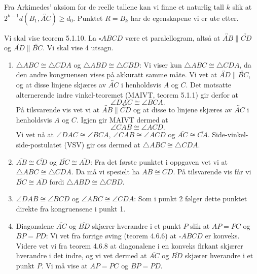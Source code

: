 \begin{oppgave}[4.8.10]
    Fra Arkimedes' aksiom for de reelle tallene kan vi finne et naturlig tall $k$ slik at $2^{k-1}d(B_1, \overleftrightarrow{AC})\geq d_0$. 
    Punktet $R=B_k$ har de egenskapene vi er ute etter. 
\end{oppgave}

\begin{oppgave}[5.1.2]
    Vi skal vise teorem 5.1.10. 
    La $\square ABCD$ være et paralellogram, altså at $\overleftrightarrow{AB}\parallel\overleftrightarrow{CD}$ og $\overleftrightarrow{AD}\parallel\overleftrightarrow{BC}$. 
    Vi skal vise 4 utsagn. 
    \begin{enumerate}
        \item $\triangle ABC\cong \triangle CDA$ og $\triangle ABD\cong \triangle CBD$: 
        Vi viser kun $\triangle ABC\cong \triangle CDA$, da den andre kongruensen vises på akkuratt samme måte. 
        Vi vet at $\overleftrightarrow{AD}\parallel\overleftrightarrow{BC}$, og at disse linjene skjæres av $\overleftrightarrow{AC}$ i henholdsvis $A$ og $C$. 
        Det motsatte alternerende indre vinkel-teoremet (MAIVT, teorem 5.1.1) gir derfor at 
        $$\angle DAC\cong \angle BCA.$$
        På tilsvarende vis vet vi at $\overleftrightarrow{AB}\parallel\overleftrightarrow{CD}$ og at disse to linjene skjæres av $\overleftrightarrow{AC}$ i henholdsvis $A$ og $C$. 
        Igjen gir MAIVT dermed at 
        $$\angle CAB\cong \angle ACD.$$
        Vi vet nå at $\angle DAC\cong \angle BCA$, $\angle CAB\cong\angle ACD$ og $\overline{AC}\cong\overline{CA}$. 
        Side-vinkel-side-postulatet (VSV) gir oss dermed at $\triangle ABC\cong \triangle CDA$. 

        \item $\overline{AB}\cong \overline{CD}$ og $\overline{BC}\cong\overline{AD}$: 
        Fra det første punktet i oppgaven vet vi at $\triangle ABC\cong \triangle CDA$. 
        Da må vi spesielt ha $\overline{AB}\cong \overline{CD}$. 
        På tilsvarende vis får vi $\overline{BC}\cong \overline{AD}$ fordi $\triangle ABD\cong \triangle CBD$. 

        \item $\angle DAB\cong\angle BCD$ og $\angle ABC\cong\angle CDA$: 
        Som i punkt 2 følger dette punktet direkte fra kongruensene i punkt 1. 

        \item Diagonalene $\overline{AC}$ og $\overline{BD}$ skjærer hverandre i et punkt $P$ slik at $AP=PC$ og $BP=PD$: 
        Vi vet fra forrige øving (teorem 4.6.6) at $\square ABCD$ er konveks. 
        Videre vet vi fra teorem 4.6.8 at diagonalene i en konveks firkant skjærer hverandre i det indre, og vi vet dermed at $\overline{AC}$ og $\overline{BD}$ skjærer hverandre i et punkt $P$. 
        Vi må vise at $AP=PC$ og $BP=PD$. 


\end{enumerate}
\end{oppgave}
